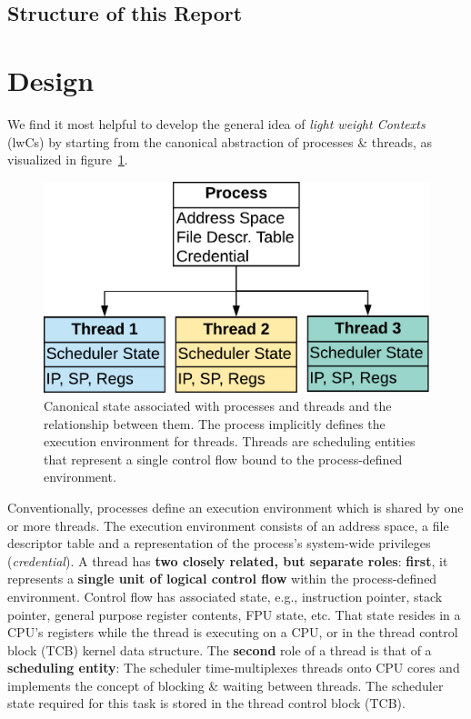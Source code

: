 \documentclass[10pt,twocolumn,letter]{article}
\begin{document}
\subsection{Structure of this Report}
\blindtext


\section{Design}\label{design}
We find it most helpful to develop the general idea of \textit{light weight Contexts} (lwCs) by starting from the canonical abstraction of processes \& threads, as visualized in figure~\ref{design:fig:canonicalprocthreads}.
\begin{figure}
  \label{design:fig:canonicalprocthreads}
  \includegraphics[width=\linewidth]{fig/canonical-proc-thread-relationship}
  \caption{
    Canonical state associated with processes and threads and the relationship between them.
    The process implicitly defines the execution environment for threads.
    Threads are scheduling entities that represent a single control flow bound to the process-defined environment.
  }
\end{figure}
Conventionally, processes define an execution environment which is shared by one or more threads.
The execution environment consists of an address space, a file descriptor table and a representation of the process's system-wide privileges (\textit{credential}).
A thread has \textbf{two closely related, but separate roles}:
\textbf{first}, it represents a \textbf{single unit of logical control flow} within the process-defined environment.
Control flow has associated state, e.g., instruction pointer, stack pointer, general purpose register contents, FPU state, etc.
That state resides in a CPU's registers while the thread is executing on a CPU, or in the thread control block (TCB) kernel data structure.
The \textbf{second} role of a thread is that of a \textbf{scheduling entity}:
The scheduler time-multiplexes threads onto CPU cores and implements the concept of blocking \& waiting between threads.
The scheduler state required for this task is stored in the thread control block (TCB).
\end{document}
